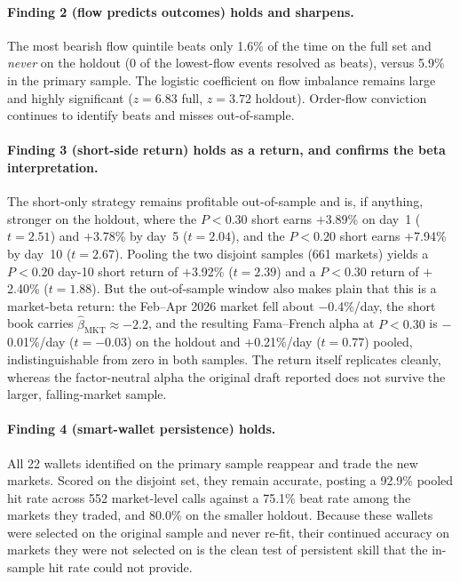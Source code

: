 \documentclass[11pt]{article}
\begin{document}
\paragraph{Finding 2 (flow predicts outcomes) holds and sharpens.} The most bearish flow quintile beats only 1.6\% of the time on the full set and \textit{never} on the holdout (0 of the lowest-flow events resolved as beats), versus 5.9\% in the primary sample. The logistic coefficient on flow imbalance remains large and highly significant ($z = 6.83$ full, $z = 3.72$ holdout). Order-flow conviction continues to identify beats and misses out-of-sample.

\paragraph{Finding 3 (short-side return) holds as a return, and confirms the beta interpretation.} The short-only strategy remains profitable out-of-sample and is, if anything, stronger on the holdout, where the $P<0.30$ short earns $+$3.89\% on day~1 ($t = 2.51$) and $+$3.78\% by day~5 ($t = 2.04$), and the $P<0.20$ short earns $+$7.94\% by day~10 ($t = 2.67$). Pooling the two disjoint samples (661 markets) yields a $P<0.20$ day-10 short return of $+$3.92\% ($t = 2.39$) and a $P<0.30$ return of $+$2.40\% ($t = 1.88$). But the out-of-sample window also makes plain that this is a market-beta return: the Feb--Apr 2026 market fell about $-$0.4\%/day, the short book carries $\hat\beta_{\text{MKT}}\approx-2.2$, and the resulting Fama--French alpha at $P<0.30$ is $-$0.01\%/day ($t=-0.03$) on the holdout and $+$0.21\%/day ($t=0.77$) pooled, indistinguishable from zero in both samples. The return itself replicates cleanly, whereas the factor-neutral alpha the original draft reported does not survive the larger, falling-market sample.

\paragraph{Finding 4 (smart-wallet persistence) holds.} All 22 wallets identified on the primary sample reappear and trade the new markets. Scored on the disjoint set, they remain accurate, posting a 92.9\% pooled hit rate across 552 market-level calls against a 75.1\% beat rate among the markets they traded, and 80.0\% on the smaller holdout. Because these wallets were selected on the original sample and never re-fit, their continued accuracy on markets they were not selected on is the clean test of persistent skill that the in-sample hit rate could not provide.
\end{document}
